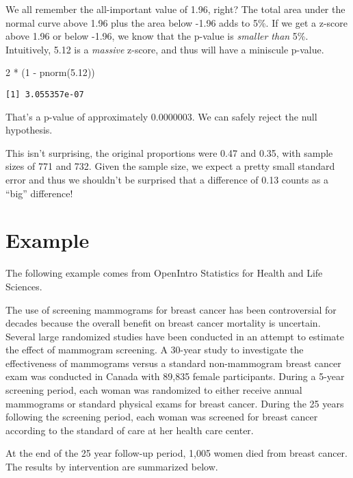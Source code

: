 \documentclass[
  letterpaper,
  DIV=11,
  numbers=noendperiod]{scrreprt}
\newenvironment{Shaded}{\begin{snugshade}}{\end{snugshade}}
\newcommand{\DecValTok}[1]{\textcolor[rgb]{0.68,0.00,0.00}{#1}}
\newcommand{\FloatTok}[1]{\textcolor[rgb]{0.68,0.00,0.00}{#1}}
\newcommand{\FunctionTok}[1]{\textcolor[rgb]{0.28,0.35,0.67}{#1}}
\newcommand{\NormalTok}[1]{\textcolor[rgb]{0.00,0.23,0.31}{#1}}
\newcommand{\SpecialCharTok}[1]{\textcolor[rgb]{0.37,0.37,0.37}{#1}}
\begin{document}
We all remember the all-important value of 1.96, right? The total area
under the normal curve above 1.96 plus the area below -1.96 adds to 5\%.
If we get a z-score above 1.96 or below -1.96, we know that the p-value
is \emph{smaller than} 5\%. Intuitively, 5.12 is a \emph{massive}
z-score, and thus will have a miniscule p-value.

\begin{Shaded}
\begin{Highlighting}[]
\DecValTok{2} \SpecialCharTok{*}\NormalTok{ (}\DecValTok{1} \SpecialCharTok{{-}} \FunctionTok{pnorm}\NormalTok{(}\FloatTok{5.12}\NormalTok{))}
\end{Highlighting}
\end{Shaded}

\begin{verbatim}
[1] 3.055357e-07
\end{verbatim}

That's a p-value of approximately 0.0000003. We can safely reject the
null hypothesis.

This isn't surprising, the original proportions were 0.47 and 0.35, with
sample sizes of 771 and 732. Given the sample size, we expect a pretty
small standard error and thus we shouldn't be surprised that a
difference of 0.13 counts as a ``big'' difference!

\hypertarget{example-4}{%
\section{Example}\label{example-4}}

The following example comes from OpenIntro Statistics for Health and
Life Sciences.

The use of screening mammograms for breast cancer has been controversial
for decades because the overall benefit on breast cancer mortality is
uncertain. Several large randomized studies have been conducted in an
attempt to estimate the effect of mammogram screening. A 30-year study
to investigate the effectiveness of mammograms versus a standard
non-mammogram breast cancer exam was conducted in Canada with 89,835
female participants. During a 5-year screening period, each woman was
randomized to either receive annual mammograms or standard physical
exams for breast cancer. During the 25 years following the screening
period, each woman was screened for breast cancer according to the
standard of care at her health care center.

At the end of the 25 year follow-up period, 1,005 women died from breast
cancer. The results by intervention are summarized below.
\end{document}
